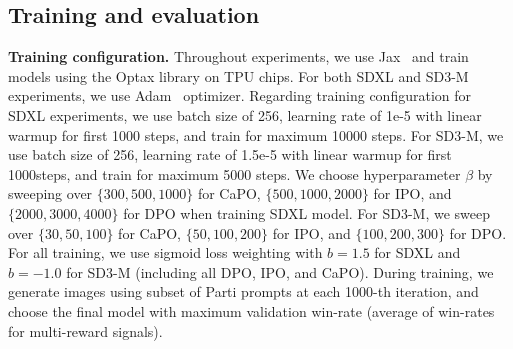 

\subsection{Training and evaluation}
\vspace{0.05in}
\noindent
{\bf Training configuration.} Throughout experiments, we use Jax~\citep{frostig2018compiling} and train models using the Optax library on TPU chips.
For both SDXL and SD3-M experiments, we use Adam~\citep{kingma2014adam} optimizer.
Regarding training configuration for SDXL experiments, we use batch size of 256, learning rate of 1e-5 with linear warmup for first 1000 steps, and train for maximum 10000 steps. 
For SD3-M, we use batch size of 256, learning rate of 1.5e-5 with linear warmup for first 1000steps, and train for maximum 5000 steps.
We choose hyperparameter $\beta$ by sweeping over $\{300, 500, 1000\}$ for CaPO, $\{500, 1000, 2000\}$ for IPO, and $\{2000, 3000, 4000\}$ for DPO when training SDXL model. 
For SD3-M, we sweep over $\{30, 50, 100\}$ for CaPO, $\{50, 100, 200\}$ for IPO, and $\{100, 200, 300\}$ for DPO.
For all training, we use sigmoid loss weighting with $b=1.5$ for SDXL and $b=-1.0$ for SD3-M (including all DPO, IPO, and CaPO). 
During training, we generate images using subset of Parti prompts at each 1000-th iteration, and choose the final model with maximum validation win-rate (average of win-rates for multi-reward signals).




